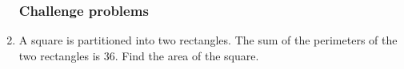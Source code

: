 \begin{enumerate}
\newpage    
\subsubsection*{Challenge problems}
\item A square is partitioned into two rectangles. The sum of the perimeters of the two rectangles is 36. Find the area of the square.
\begin{flushright}
\end{flushright}


\end{enumerate}
